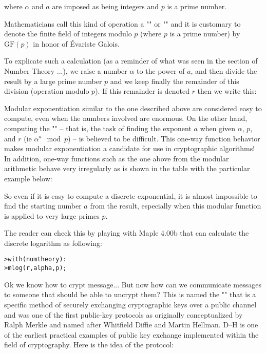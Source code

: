 	where $\alpha$ and $a$ are imposed as being integers and $p$ is a prime number.
	
	Mathematicians call this kind of operation a "" or "" and it is customary to denote the finite field of integers modulo $p$ (where $p$ is a prime number) by $\text{GF}(p)$ in honor of Évariste Galois.
	
	To explicate such a calculation (as a reminder of what was seen in the section of Number Theory ...), we raise a number $\alpha$ to the power of $a$, and then divide the result by a large prime number $p$ and we keep finally the remainder of this division (operation modulo $p$). If this remainder is denoted $r$ then we write this:
	
	Modular exponentiation similar to the one described above are considered easy to compute, even when the numbers involved are enormous. On the other hand, computing the "" – that is, the task of finding the exponent $a$ when given $\alpha$, $p$, and $r$ (ie $\alpha^a \mod p$) – is believed to be difficult. This one-way function behavior makes modular exponentiation a candidate for use in cryptographic algorithms! In addition, one-way functions such as the one above from the modular arithmetic behave very irregularly as is shown in the table with the particular example below:
	
	So even if it is easy to compute a discrete exponential, it is almost impossible to find the starting number $a$ from the result, especially when this modular function is applied to very large primes $p$.

	The reader can check this by playing with Maple 4.00b that can calculate the discrete logarithm as following:
	
	\texttt{>with(numtheory):\\
	>mlog(r,alpha,p);}
	
	Ok we know how to crypt message... But now how can we communicate messages to someone that should be able to uncrypt them? This is named the "" that is a specific method of securely exchanging cryptographic keys over a public channel and was one of the first public-key protocols as originally conceptualized by Ralph Merkle and named after Whitfield Diffie and Martin Hellman. D–H is one of the earliest practical examples of public key exchange implemented within the field of cryptography. Here is the idea of the protocol:
	

